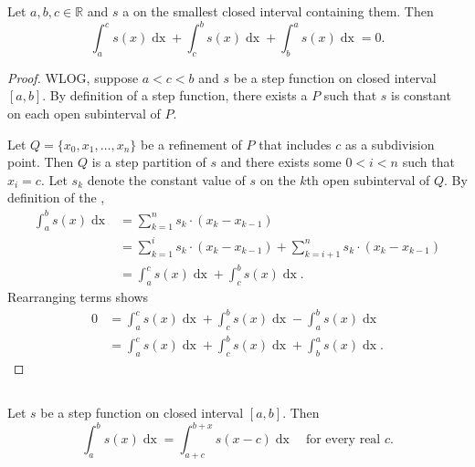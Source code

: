 \documentclass{report}
\begin{document}
\begin{theorem}[1.6]

  Let $a, b, c \in \mathbb{R}$ and $s$ a  on the
    smallest closed interval containing them.
  Then
    $$\int_a^c s(x) \mathop{dx} + \int_c^b s(x) \mathop{dx} +
      \int_b^a s(x) \mathop{dx} = 0.$$

\end{theorem}

\begin{proof}

  WLOG, suppose $a < c < b$ and $s$ be a step function on closed interval
    $[a, b]$.
  By definition of a step function, there exists a 
    $P$ such that $s$ is constant on each open subinterval of $P$.

  Let $Q = \{x_0, x_1, \ldots, x_n\}$ be a refinement of $P$ that includes $c$
    as a subdivision point.
  Then $Q$ is a step partition of $s$ and there exists some $0 < i < n$ such
    that $x_i = c$.
  Let $s_k$ denote the constant value of $s$ on the $k$th open subinterval of
    $Q$.
  By definition of the ,
    \begin{align*}
      \int_a^b s(x) \mathop{dx}
        & = \sum_{k=1}^n s_k \cdot (x_k - x_{k - 1}) \\
        & = \sum_{k=1}^i s_k \cdot (x_k - x_{k - 1}) +
            \sum_{k=i+1}^n s_k \cdot (x_k - x_{k - 1}) \\
        & = \int_a^c s(x) \mathop{dx} + \int_c^b s(x) \mathop{dx}.
    \end{align*}
  Rearranging terms shows
    \begin{align*}
      0
        & = \int_a^c s(x) \mathop{dx} + \int_c^b s(x) \mathop{dx} -
            \int_a^b s(x) \mathop{dx} \\
        & = \int_a^c s(x) \mathop{dx} + \int_c^b s(x) \mathop{dx} +
            \int_b^a s(x) \mathop{dx}.
    \end{align*}

\end{proof}

\subsection{}%
\label{sub:step-invariance-under-translation}
\label{sub:theorem-1.7}

\begin{theorem}[1.7]

  Let $s$ be a step function on closed interval $[a, b]$.
  Then
    $$\int_a^b s(x) \mathop{dx} =
      \int_{a+c}^{b+x} s(x - c) \mathop{dx} \quad\text{for every real } c.$$

\end{theorem}
\end{document}
